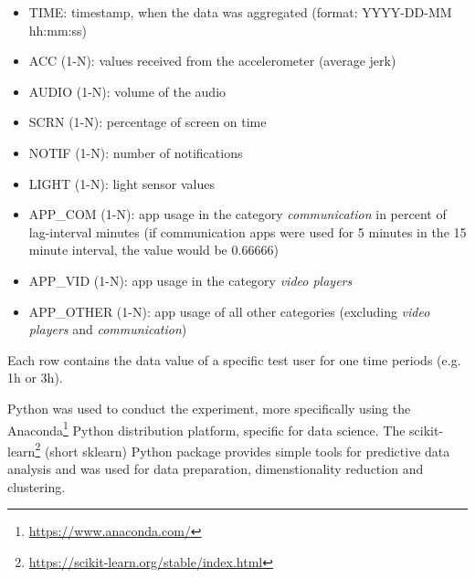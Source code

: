 \begin{itemize}
	\item TIME: timestamp, when the data was aggregated (format: YYYY-DD-MM hh:mm:ss)
	\item ACC (1-N): values received from the accelerometer (average jerk)
	\item AUDIO (1-N): volume of the audio 
	\item SCRN (1-N): percentage of screen on time
	\item NOTIF (1-N): number of notifications
	\item LIGHT (1-N): light sensor values
	\item APP\_COM (1-N): app usage in the category \textit{communication} in percent of lag-interval minutes (if communication apps were used for 5 minutes in the 15 minute interval, the value would be 0.66666)
	\item APP\_VID (1-N): app usage in the category \textit{video players}
	\item APP\_OTHER (1-N): app usage of all other categories (excluding \textit{video players} and \textit{communication})
\end{itemize}

Each row contains the data value of a specific test user for one time periods (e.g. 1h or 3h).

Python was used to conduct the experiment, more specifically using the Anaconda\footnote{\url{https://www.anaconda.com/}} Python distribution platform, specific for data science. The scikit-learn\footnote{\url{https://scikit-learn.org/stable/index.html}}  (short sklearn) Python package provides simple tools for predictive data analysis and was used for data preparation, dimenstionality reduction and clustering.





